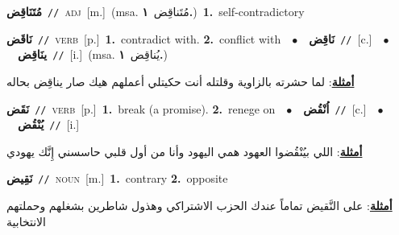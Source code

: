 \documentclass[10pt,a4paper,twoside]{article} %
\begin{document}
\begin{multicols}{2}
{\setlength\topsep{0pt}\textbf{\foreignlanguage{arabic}{مُتَنَاقِض}}\ {\color{gray}\texttt{//}\color{black}}\ \textsc{adj}\ [m.]\ \color{gray}(msa. \foreignlanguage{arabic}{مُتَناقِض}~\foreignlanguage{arabic}{\textbf{١.}})\color{black}\ \textbf{1.}~self-contradictory\ } \vspace{2mm}

{\setlength\topsep{0pt}\textbf{\foreignlanguage{arabic}{نَاقَض}}\ {\color{gray}\texttt{//}\color{black}}\ \textsc{verb}\ [p.]\ \textbf{1.}~contradict with.  \textbf{2.}~conflict with\ \ $\bullet$\ \ \setlength\topsep{0pt}\textbf{\foreignlanguage{arabic}{نَاقِض}}\ {\color{gray}\texttt{//}\color{black}}\ [c.]\ \ $\bullet$\ \ \setlength\topsep{0pt}\textbf{\foreignlanguage{arabic}{ينَاقِض}}\ {\color{gray}\texttt{//}\color{black}}\ [i.]\ \color{gray}(msa. \foreignlanguage{arabic}{يُناقِض}~\foreignlanguage{arabic}{\textbf{١.}})\color{black}\  \begin{flushright}\color{gray}\foreignlanguage{arabic}{\textbf{\underline{\foreignlanguage{arabic}{أمثلة}}}: لما حشرته بالزاوية وقلتله أنت حكيتلي أعملهم هيك صار يناقِض بحاله}\end{flushright}\color{black}} \vspace{2mm}

{\setlength\topsep{0pt}\textbf{\foreignlanguage{arabic}{نَقَض}}\ {\color{gray}\texttt{//}\color{black}}\ \textsc{verb}\ [p.]\ \textbf{1.}~break (a promise).  \textbf{2.}~renege on\ \ $\bullet$\ \ \setlength\topsep{0pt}\textbf{\foreignlanguage{arabic}{اُنْقُض}}\ {\color{gray}\texttt{//}\color{black}}\ [c.]\ \ $\bullet$\ \ \setlength\topsep{0pt}\textbf{\foreignlanguage{arabic}{يُنْقُض}}\ {\color{gray}\texttt{//}\color{black}}\ [i.]\  \begin{flushright}\color{gray}\foreignlanguage{arabic}{\textbf{\underline{\foreignlanguage{arabic}{أمثلة}}}: اللي بيُنْقُضوا العهود همي اليهود وأنا من أول قلبي حاسسني إِنَّك يهودي}\end{flushright}\color{black}} \vspace{2mm}

{\setlength\topsep{0pt}\textbf{\foreignlanguage{arabic}{نَقِيض}}\ {\color{gray}\texttt{//}\color{black}}\ \textsc{noun}\ [m.]\ \textbf{1.}~contrary  \textbf{2.}~opposite\  \begin{flushright}\color{gray}\foreignlanguage{arabic}{\textbf{\underline{\foreignlanguage{arabic}{أمثلة}}}: على النَّقيض تماماً عندك الحزب الاشتراكي وهذول شاطرين بشغلهم وحملتهم الانتخابية}\end{flushright}\color{black}} \vspace{2mm}


\end{multicols}
\end{document}
